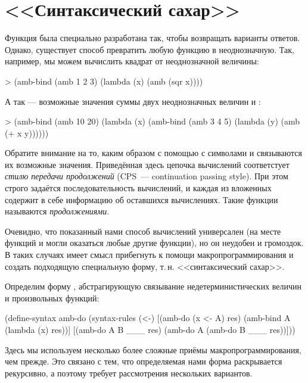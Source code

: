 \section{<<Синтаксический сахар>>}%
Функция  была специально разработана так, чтобы возвращать варианты ответов. Однако, существует способ превратить любую функцию в неоднозначную. Так, например, мы можем вычислить квадрат от неоднозначной величины:
\begin{SchemeCode}[emph={x}]
   > (amb-bind (amb 1 2 3) (lambda (x) (amb (sqr x))))
\end{SchemeCode}\vspace{-\medskipamount}
А так --- возможные значения суммы двух неоднозначных величин  и :
\begin{SchemeCode}[emph={x,y}]
   > (amb-bind (amb 10 20) 
               (lambda (x) (amb-bind (amb 3 4 5)
                                (lambda (y) (amb (+ x y))))))
\end{SchemeCode}\vspace{-\medskipamount}
Обратите внимание на то, каким образом с помощью  с символами  и  связываются их возможные значения. Приведённая здесь цепочка вычислений соответстует \emph{стилю передачи продолжений} (CPS~--- continuation passing style). При этом строго задаётся последовательность вычислений, и каждая из вложенных  содержит в себе информацию об оставшихся вычислениях. Такие функции называются \emph{продолжениями}.

Очевидно, что показанный нами способ вычислений универсален (на месте функций   и \s{+} могли оказаться любые другие функции), но он неудобен и громоздок. В таких случаях имеет смысл прибегнуть к помощи макропрограммирования и создать подходящую специальную форму, т.\,н. <<синтаксический сахар>>.

Определим форму , абстрагирующую связывание недетерминистических величин и произвольных функций:

\begin{Definition}[emph={x,A,res,B}]
(define-syntax amb-do
  (syntax-rules (<-) 
    [(amb-do (x <- A) res) (amb-bind A (lambda (x) res))]
    [(amb-do A B ___ res)  (amb-do A (amb-do B ___ res))]))
\end{Definition}

Здесь мы используем несколько более сложные приёмы макропрограммирования, чем прежде. Это связано с тем, что определяемая нами форма раскрывается рекурсивно, а поэтому требует рассмотрения нескольких вариантов. 

